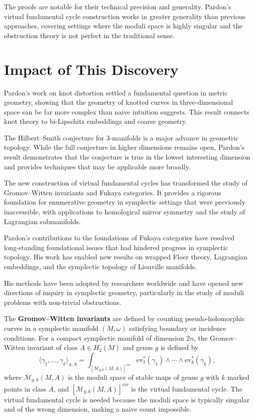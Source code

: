 The proofs are notable for their technical precision and generality. Pardon's virtual fundamental cycle construction works in greater generality than previous approaches, covering settings where the moduli space is highly singular and the obstruction theory is not perfect in the traditional sense.

\section{Impact of This Discovery}

Pardon's work on knot distortion settled a fundamental question in metric geometry, showing that the geometry of knotted curves in three-dimensional space can be far more complex than naive intuition suggests. This result connects knot theory to bi-Lipschitz embeddings and coarse geometry.

The Hilbert--Smith conjecture for 3-manifolds is a major advance in geometric topology. While the full conjecture in higher dimensions remains open, Pardon's result demonstrates that the conjecture is true in the lowest interesting dimension and provides techniques that may be applicable more broadly.

The new construction of virtual fundamental cycles has transformed the study of Gromov--Witten invariants and Fukaya categories. It provides a rigorous foundation for enumerative geometry in symplectic settings that were previously inaccessible, with applications to homological mirror symmetry and the study of Lagrangian submanifolds.

Pardon's contributions to the foundations of Fukaya categories have resolved long-standing foundational issues that had hindered progress in symplectic topology. His work has enabled new results on wrapped Floer theory, Lagrangian embeddings, and the symplectic topology of Liouville manifolds.

His methods have been adopted by researchers worldwide and have opened new directions of inquiry in symplectic geometry, particularly in the study of moduli problems with non-trivial obstructions.

The \textbf{Gromov--Witten invariants} are defined by counting pseudo-holomorphic curves in a symplectic manifold $(M, \omega)$ satisfying boundary or incidence conditions. For a compact symplectic manifold of dimension $2n$, the Gromov--Witten invariant of class $A \in H_2(M)$ and genus $g$ is defined by
\[
\langle \gamma_1, \ldots, \gamma_k \rangle_{g,A} = \int_{[\overline{\mathcal{M}}_{g,k}(M,A)]^{vir}} \mathrm{ev}_1^*(\gamma_1) \wedge \cdots \wedge \mathrm{ev}_k^*(\gamma_k),
\]
where $\overline{\mathcal{M}}_{g,k}(M,A)$ is the moduli space of stable maps of genus $g$ with $k$ marked points in class $A$, and $[\overline{\mathcal{M}}_{g,k}(M,A)]^{vir}$ is the virtual fundamental cycle. The virtual fundamental cycle is needed because the moduli space is typically singular and of the wrong dimension, making a naive count impossible.

